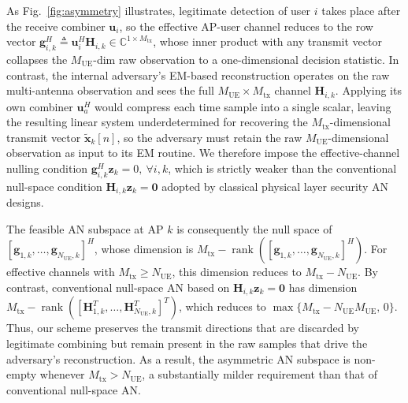 \documentclass[lettersize,journal]{IEEEtran}
\begin{document}
As Fig.~\ref{fig:asymmetry} illustrates, legitimate detection of user $i$ takes place after the receive combiner $\mathbf{u}_i$, so the effective AP-user channel reduces to the row vector $\mathbf{g}_{i,k}^H\triangleq\mathbf{u}_i^H\mathbf{H}_{i,k}\in\mathbb{C}^{1\times M_{\mathrm{tx}}}$, whose inner product with any transmit vector collapses the $M_{\mathrm{UE}}$-dim raw observation to a one-dimensional decision statistic. In contrast, the internal adversary's EM-based reconstruction operates on the raw multi-antenna observation and sees the full $M_{\mathrm{UE}}\times M_{\mathrm{tx}}$ channel $\mathbf{H}_{i,k}$. Applying its own combiner $\mathbf{u}_a^H$ would compress each time sample into a single scalar, leaving the resulting linear system underdetermined for recovering the $M_{\mathrm{tx}}$-dimensional transmit vector $\widetilde{\mathbf{x}}_k[n]$, so the adversary must retain the raw $M_{\mathrm{UE}}$-dimensional observation as input to its EM routine. We therefore impose the effective-channel nulling condition $\mathbf{g}_{i,k}^H\mathbf{z}_k=0,\ \forall i,k$, which is strictly weaker than the conventional null-space condition $\mathbf{H}_{i,k}\mathbf{z}_k=\mathbf{0}$ adopted by classical physical layer security AN designs.

The feasible AN subspace at AP $k$ is consequently the null space of $[\mathbf{g}_{1,k},\ldots,\mathbf{g}_{N_{\mathrm{UE}},k}]^H$, whose dimension is $M_{\mathrm{tx}}-\operatorname{rank}([\mathbf{g}_{1,k},\ldots,\mathbf{g}_{N_{\mathrm{UE}},k}]^H)$. For effective channels with $M_{\mathrm{tx}}\ge N_{\mathrm{UE}}$, this dimension reduces to $M_{\mathrm{tx}}-N_{\mathrm{UE}}$. By contrast, conventional null-space AN based on $\mathbf{H}_{i,k}\mathbf{z}_k=\mathbf{0}$ has dimension $M_{\mathrm{tx}}-\operatorname{rank}([\mathbf{H}_{1,k}^T,\ldots,\mathbf{H}_{N_{\mathrm{UE}},k}^T]^T)$, which reduces to $\max\{M_{\mathrm{tx}}-N_{\mathrm{UE}}M_{\mathrm{UE}},\,0\}$. Thus, our scheme preserves the transmit directions that are discarded by legitimate combining but remain present in the raw samples that drive the adversary's reconstruction. As a result, the asymmetric AN subspace is non-empty whenever $M_{\mathrm{tx}}>N_{\mathrm{UE}}$, a substantially milder requirement than that of conventional null-space AN.
\end{document}
